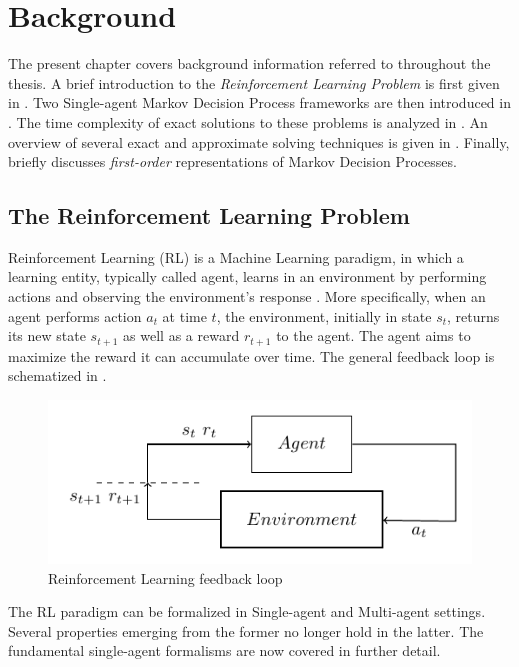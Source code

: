 
\chapter{Background}
\label{chap:background}
The present chapter covers background information referred to throughout the thesis. A brief introduction to the \textit{Reinforcement Learning Problem} is first given in . Two Single-agent Markov Decision Process frameworks are then introduced in . The time complexity of exact solutions to these problems is analyzed in . An overview of several exact and approximate solving techniques is given in . Finally,  briefly discusses \textit{first-order} representations of Markov Decision Processes.
\section{The Reinforcement Learning Problem}
\label{sec:rl}
Reinforcement Learning (RL) is a Machine Learning paradigm, in which a learning entity, typically called agent, learns in an environment by performing actions and observing the environment's response \cite{RLgeneral}. More specifically, when an agent performs action $a_t$ at time $t$, the environment, initially in state $s_t$, returns its new state $s_{t+1}$ as well as a reward $r_{t+1}$ to the agent. The agent aims to maximize the reward it can accumulate over time. The general feedback loop is schematized in .

\begin{figure}[h]
  \begin{center}
    \includegraphics{images/MasterThesisRLLoop.pdf}
  \end{center}
  \caption{Reinforcement Learning feedback loop}\label{fig:feedback}
\end{figure}

The RL paradigm can be formalized in Single-agent and Multi-agent settings. Several properties emerging from the former no longer hold in the latter. The fundamental single-agent formalisms are now covered in further detail.

